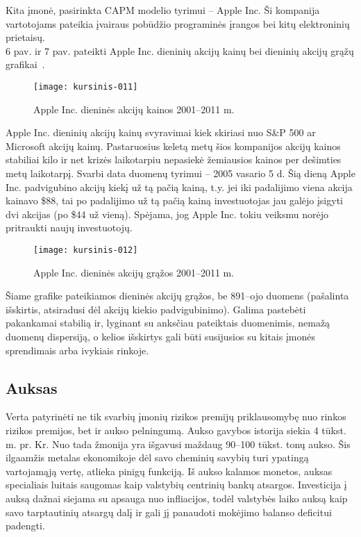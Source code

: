 \documentclass[12pt, a14paper, lithuanian]{article}
\begin{document}
Kita įmonė, pasirinkta CAPM modelio tyrimui -- Apple Inc. Ši kompanija vartotojams pateikia įvairaus pobūdžio programinės įrangos bei kitų elektroninių prietaisų. \\
6 pav. ir 7 pav. pateikti Apple Inc. dieninių akcijų
kainų bei dieninių akcijų grąžų grafikai~\cite{apple}.

\begin{figure}[H]
  \centering
\texttt{[image: kursinis-011]}
  \caption{Apple Inc. dieninės akcijų kainos 2001--2011 m.}
  \label{fig:6}
\end{figure}

Apple Inc. dieninių akcijų kainų svyravimai kiek skiriasi nuo S\&P 500 ar Microsoft akcijų kainų. Pastaruosius
keletą metų šios kompanijos akcijų kainos stabiliai kilo ir net krizės laikotarpiu nepasiekė žemiausios
kainos per dešimties metų laikotarpį. Svarbi data duomenų tyrimui -- 2005 vasario 5 d. Šią dieną Apple Inc.
padvigubino akcijų kiekį už tą pačią kainą, t.y. jei iki padalijimo viena akcija kainavo \$88, tai po padalijimo
už tą pačią kainą investuotojas jau galėjo įsigyti dvi akcijas (po \$44 už vieną). Spėjama, jog Apple Inc.
tokiu veiksmu norėjo pritraukti naujų investuotojų.

\begin{figure}[H]
  \centering
\texttt{[image: kursinis-012]}
  \caption{Apple Inc. dieninės akcijų grąžos 2001--2011 m.}
  \label{fig:7}
\end{figure}
             
Šiame grafike pateikiamos dieninės akcijų grąžos, be 891--ojo duomens (pašalinta išskirtis, atsiradusi dėl akcijų kiekio padvigubinimo). Galima pastebėti pakankamai stabilią ir, lyginant su anksčiau pateiktais duomenimis, nemažą duomenų dispersiją, o kelios išskirtys gali būti susijusios su kitais įmonės sprendimais arba ivykiais rinkoje. \\

\subsection{Auksas}

Verta patyrinėti ne tik svarbių įmonių rizikos premijų priklausomybę nuo rinkos rizikos premijos, bet ir
aukso pelningumą. Aukso gavybos istorija siekia 4 tūkst. m. pr. Kr. Nuo tada žmonija yra išgavusi maždaug 90--100 tūkst. tonų aukso. Šis ilgaamžis metalas ekonomikoje dėl savo cheminių savybių turi ypatingą vartojamąją vertę, atlieka pinigų funkciją. Iš aukso kalamos monetos, auksas specialiais luitais saugomas kaip valstybių centrinių bankų atsargos. Investicija į auksą dažnai siejama su apsauga nuo infliacijos, todėl valstybės laiko auksą kaip savo tarptautinių atsargų dalį ir gali jį panaudoti mokėjimo balanso deficitui padengti.\\
\end{document}

